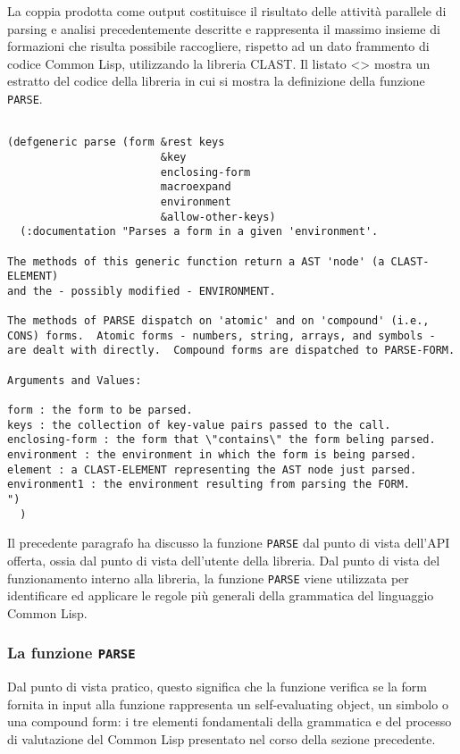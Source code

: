 La coppia prodotta come output costituisce il risultato delle attività
parallele di parsing e analisi precedentemente descritte e rappresenta il
massimo insieme di formazioni che risulta possibile raccogliere, rispetto ad
un dato frammento di codice Common Lisp, utilizzando la libreria CLAST. Il
listato <> mostra un estratto del codice della libreria in cui si mostra la
definizione della funzione \texttt{PARSE}.

\begin{lstlisting}[caption=Definizione e documentazione relative alla funzione
\texttt{PARSE}]

(defgeneric parse (form &rest keys
                        &key
                        enclosing-form
                        macroexpand
                        environment
                        &allow-other-keys)
  (:documentation "Parses a form in a given 'environment'.

The methods of this generic function return a AST 'node' (a CLAST-ELEMENT)
and the - possibly modified - ENVIRONMENT.

The methods of PARSE dispatch on 'atomic' and on 'compound' (i.e.,
CONS) forms.  Atomic forms - numbers, string, arrays, and symbols -
are dealt with directly.  Compound forms are dispatched to PARSE-FORM.

Arguments and Values:

form : the form to be parsed.
keys : the collection of key-value pairs passed to the call.
enclosing-form : the form that \"contains\" the form beling parsed.
environment : the environment in which the form is being parsed.
element : a CLAST-ELEMENT representing the AST node just parsed.
environment1 : the environment resulting from parsing the FORM.
")
  )

\end{lstlisting}

Il precedente paragrafo ha discusso la funzione \texttt{PARSE} dal punto di
vista dell'API offerta, ossia dal punto di vista dell'utente della libreria.
Dal punto di vista del funzionamento interno alla libreria, la funzione
\texttt{PARSE} viene utilizzata per identificare ed applicare le regole più
generali della grammatica del linguaggio Common Lisp.

\subsubsection{La funzione \texttt{PARSE}}

Dal punto di vista pratico, questo significa che la funzione verifica se la
form fornita in input alla funzione rappresenta un self-evaluating object, un
simbolo o una compound form: i tre elementi fondamentali della grammatica e
del processo di valutazione del Common Lisp presentato nel corso della sezione
precedente.\\

